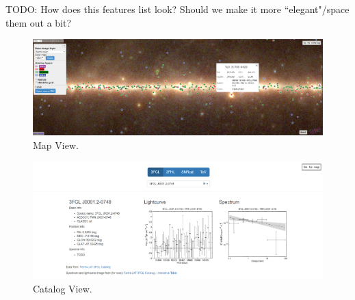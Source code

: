 TODO: How does this features list look? Should we make it more ``elegant"/space them out a bit?

\begin{figure}[t]
\centerline{\includegraphics[width=\textwidth]{figures/mapview_wide}}
\caption{Map View.}
\label{fig:mapview}
\end{figure}

\begin{figure}[t]
\centerline{\includegraphics[width=\textwidth]{figures/catview_wide_zoom}}
\caption{Catalog View.}
\label{fig:catview}
\end{figure}
